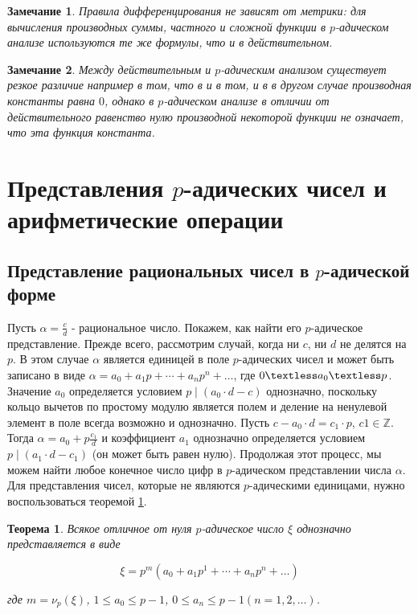 \documentclass[master, och, diploma, times]{sty/SCWorks}
\theoremstyle{plain}
\newtheorem{thethm}{Теорема}[section]
\newtheorem{note}{Замечание}[section]
\theoremstyle{definition}
\begin{document}
\begin{note}
Правила дифференцирования не зависят от метрики: для вычисления производных суммы, частного и сложной функции в $p$-адическом анализе используются те же формулы, что и в действительном.
\end{note}

\begin{note}
Между действительным и $p$-адическим анализом существует резкое различие например в том, что в и в том, и в в другом случае производная константы равна $0$, однако в $p$-адическом анализе в отличии от действительного равенство нулю производной некоторой функции не означает, что эта функция константа.
\end{note}

\section{Представления $p$-адических чисел и арифметические операции}

\subsection{Представление рациональных чисел в $p$-адической форме}
Пусть $\alpha=\frac{c}{d}$ - рациональное число. Покажем, как найти его $p$-адическое представление. Прежде всего, рассмотрим случай, когда ни $c$, ни $d$ не делятся на $p$. В этом случае $\alpha$ является единицей в поле $p$-адических чисел и может быть записано в виде $\alpha=a_0+a_1p+\cdots+a_np^n+\dots $, где $0 \textless a_0 \textless p$. Значение $a_0$ определяется условием $p \mid (a_0 \cdot d-c)$ однозначно, поскольку кольцо вычетов по простому модулю является полем и деление на ненулевой элемент в поле всегда возможно и однозначно. Пусть $c-a_0 \cdot d=c_1 \cdot p$, $c1 \in \mathbb{Z}$. Тогда $\alpha=a_0+p\frac{c_1}{d}$ и коэффициент $a_1$ однозначно определяется условием $p \mid (a_1 \cdot d-c_1)$ (он может быть равен нулю). Продолжая этот процесс, мы можем найти любое конечное число цифр в $p$-адическом представлении числа $\alpha$. Для представления чисел, которые не являются $p$-адическими единицами, нужно воспользоваться теоремой \ref{th:numbers:representation}.

\begin{thethm}\label{th:numbers:representation}
Всякое отличное от нуля $p$-адическое число $\xi$ однозначно представляется в виде

\begin{equation}
\xi=p^m(a_0+a_1p^1+\cdots+a_np^n+\dots)
\end{equation}

\noindent где $m=\nu_p(\xi)$, $1 \le a_0 \le p-1$, $0 \le a_n \le p-1$$(n=1,2,\dots)$.
\end{thethm}
\end{document}
